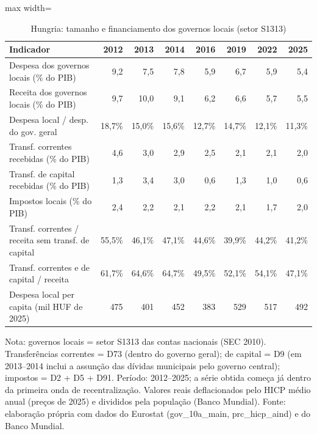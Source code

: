 \begin{table}[H]
\centering\footnotesize
\setlength{\tabcolsep}{4pt}
\caption{Hungria: tamanho e financiamento dos governos locais (setor S1313)}
\label{tab:hungria}
\begin{adjustbox}{max width=\textwidth}
\begin{tabular}{lrrrrrrr}
\toprule
Indicador & 2012 & 2013 & 2014 & 2016 & 2019 & 2022 & 2025 \\
\midrule
Despesa dos governos locais (\% do PIB) & 9,2 & 7,5 & 7,8 & 5,9 & 6,7 & 5,9 & 5,4 \\
Receita dos governos locais (\% do PIB) & 9,7 & 10,0 & 9,1 & 6,2 & 6,6 & 5,7 & 5,5 \\
Despesa local / desp. do gov. geral & 18,7\% & 15,0\% & 15,6\% & 12,7\% & 14,7\% & 12,1\% & 11,3\% \\
Transf. correntes recebidas (\% do PIB) & 4,6 & 3,0 & 2,9 & 2,5 & 2,1 & 2,1 & 2,0 \\
Transf. de capital recebidas (\% do PIB) & 1,3 & 3,4 & 3,0 & 0,6 & 1,3 & 1,0 & 0,6 \\
Impostos locais (\% do PIB) & 2,4 & 2,2 & 2,1 & 2,2 & 2,1 & 1,7 & 2,0 \\
Transf. correntes / receita sem transf. de capital & 55,5\% & 46,1\% & 47,1\% & 44,6\% & 39,9\% & 44,2\% & 41,2\% \\
Transf. correntes e de capital / receita & 61,7\% & 64,6\% & 64,7\% & 49,5\% & 52,1\% & 54,1\% & 47,1\% \\
Despesa local per capita (mil HUF de 2025) & 475 & 401 & 452 & 383 & 529 & 517 & 492 \\
\bottomrule
\end{tabular}
\end{adjustbox}
\par\vspace{3pt}\parbox{\textwidth}{\scriptsize Nota: governos locais = setor S1313 das contas nacionais (SEC 2010). Transferências correntes = D73 (dentro do governo geral); de capital = D9 (em 2013--2014 inclui a assunção das dívidas municipais pelo governo central); impostos = D2 + D5 + D91. Período: 2012--2025; a série obtida começa já dentro da primeira onda de recentralização. Valores reais deflacionados pelo HICP médio anual (preços de 2025) e divididos pela população (Banco Mundial). Fonte: elaboração própria com dados do Eurostat (gov\_10a\_main, prc\_hicp\_aind) e do Banco Mundial.}
\end{table}
